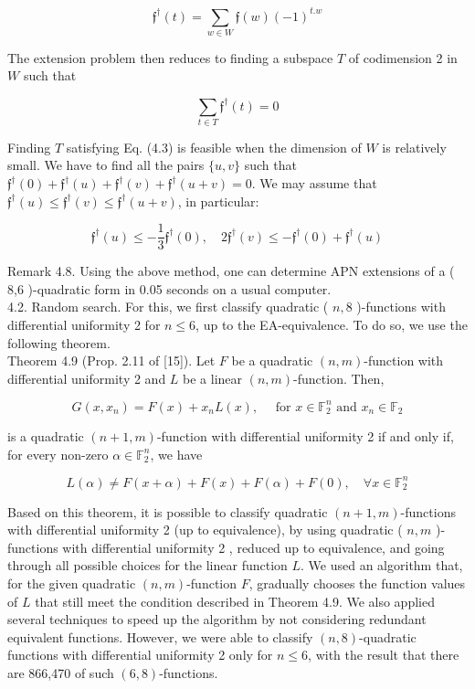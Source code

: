 \documentclass[10pt]{article}
\begin{document}
$$
\mathfrak{f}^{\dagger}(t)=\sum_{w \in W} \mathfrak{f}(w)(-1)^{t . w}
$$

The extension problem then reduces to finding a subspace $T$ of codimension 2 in $W$ such that


\begin{equation*}
\sum_{t \in T} \mathfrak{f}^{\dagger}(t)=0 \tag{4.3}
\end{equation*}


Finding $T$ satisfying Eq. (4.3) is feasible when the dimension of $W$ is relatively small. We have to find all the pairs $\{u, v\}$ such that $\mathfrak{f}^{\dagger}(0)+\mathfrak{f}^{\dagger}(u)+\mathfrak{f}^{\dagger}(v)+\mathfrak{f}^{\dagger}(u+v)=0$. We may assume that $\mathfrak{f}^{\dagger}(u) \leq \mathfrak{f}^{\dagger}(v) \leq \mathfrak{f}^{\dagger}(u+v)$, in particular:

$$
\mathfrak{f}^{\dagger}(u) \leq-\frac{1}{3} \mathfrak{f}^{\dagger}(0), \quad 2 \mathfrak{f}^{\dagger}(v) \leq-\mathfrak{f}^{\dagger}(0)+\mathfrak{f}^{\dagger}(u)
$$

Remark 4.8. Using the above method, one can determine APN extensions of a ( 8,6 )-quadratic form in 0.05 seconds on a usual computer.\\
4.2. Random search. For this, we first classify quadratic ( $n, 8$ )-functions with differential uniformity 2 for $n \leq 6$, up to the EA-equivalence. To do so, we use the following theorem.\\[0pt]
Theorem 4.9 (Prop. 2.11 of [15]). Let $F$ be a quadratic $(n, m)$-function with differential uniformity 2 and $L$ be a linear $(n, m)$-function. Then,

$$
G\left(x, x_{n}\right)=F(x)+x_{n} L(x), \quad \text { for } x \in \mathbb{F}_{2}^{n} \text { and } x_{n} \in \mathbb{F}_{2}
$$

is a quadratic $(n+1, m)$-function with differential uniformity 2 if and only if, for every non-zero $\alpha \in \mathbb{F}_{2}^{n}$, we have

$$
L(\alpha) \neq F(x+\alpha)+F(x)+F(\alpha)+F(0), \quad \forall x \in \mathbb{F}_{2}^{n}
$$

Based on this theorem, it is possible to classify quadratic $(n+1, m)$-functions with differential uniformity 2 (up to equivalence), by using quadratic ( $n, m$ )-functions with differential uniformity 2 , reduced up to equivalence, and going through all possible choices for the linear function $L$. We used an algorithm that, for the given quadratic $(n, m)$-function $F$, gradually chooses the function values of $L$ that still meet the condition described in Theorem 4.9. We also applied several techniques to speed up the algorithm by not considering redundant equivalent functions. However, we were able to classify $(n, 8)$-quadratic functions with differential uniformity 2 only for $n \leq 6$, with the result that there are 866,470 of such $(6,8)$-functions.
\end{document}
